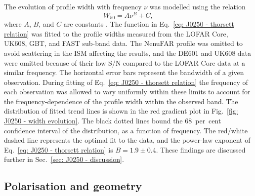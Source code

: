 The evolution of profile width with frequency $\nu$ was modelled using the relation
\begin{equation}
\label{eq: J0250 - thorsett relation}
    W_{50} = A\nu^B + C,
\end{equation}
where $A$, $B$, and $C$ are constants \citep{Txxx1991, CWxx2014}. The function in Eq.~\eqref{eq: J0250 - thorsett relation} was fitted to the profile widths measured from the LOFAR Core, UK608, GBT, and FAST sub-band data. The NenuFAR profile was omitted to avoid scattering in the ISM affecting the results, and the DE601 and UK608 data were omitted because of their low S/N compared to the LOFAR Core data at a similar frequency. The horizontal error bars represent the bandwidth of a given observation. During fitting of Eq.~\eqref{eq: J0250 - thorsett relation} the frequency of each observation was allowed to vary uniformly within these limits to account for the frequency-dependence of the profile width within the observed band. The distribution of fitted trend lines is shown in the red gradient plot in Fig.~\ref{fig: J0250 - width evolution}. The black dotted lines bound the 68~per~cent confidence interval of the distribution, as a function of frequency. The red/white dashed line represents the optimal fit to the data, and the power-law exponent of Eq.~\eqref{eq: J0250 - thorsett relation} is $B = 1.9 \pm 0.4$. These findings are discussed further in Sec.~\ref{sec: J0250 - discussion}.







\subsection{Polarisation and geometry}
\label{sec: J0250 - analysis - polarisation and geometry}

